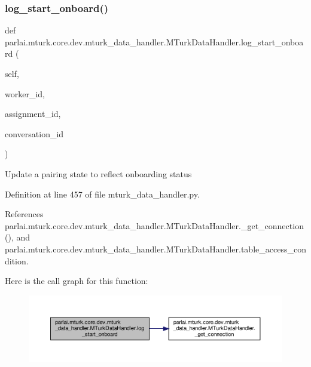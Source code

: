 \subsubsection{\texorpdfstring{log\+\_\+start\+\_\+onboard()}{log\_start\_onboard()}}
{\footnotesize\ttfamily def parlai.\+mturk.\+core.\+dev.\+mturk\+\_\+data\+\_\+handler.\+M\+Turk\+Data\+Handler.\+log\+\_\+start\+\_\+onboard (\begin{DoxyParamCaption}\item[{}]{self,  }\item[{}]{worker\+\_\+id,  }\item[{}]{assignment\+\_\+id,  }\item[{}]{conversation\+\_\+id }\end{DoxyParamCaption})}

\begin{DoxyVerb}Update a pairing state to reflect onboarding status\end{DoxyVerb}
 

Definition at line 457 of file mturk\+\_\+data\+\_\+handler.\+py.



References parlai.\+mturk.\+core.\+dev.\+mturk\+\_\+data\+\_\+handler.\+M\+Turk\+Data\+Handler.\+\_\+get\+\_\+connection(), and parlai.\+mturk.\+core.\+dev.\+mturk\+\_\+data\+\_\+handler.\+M\+Turk\+Data\+Handler.\+table\+\_\+access\+\_\+condition.

Here is the call graph for this function\+:
\nopagebreak
\begin{figure}[H]
\begin{center}
\leavevmode
\includegraphics[width=350pt]{classparlai_1_1mturk_1_1core_1_1dev_1_1mturk__data__handler_1_1MTurkDataHandler_aa084ae52cbcc1fdce7e5a20f079f3f47_cgraph}
\end{center}
\end{figure}
\mbox{\label{classparlai_1_1mturk_1_1core_1_1dev_1_1mturk__data__handler_1_1MTurkDataHandler_ac8a4ba8bd6942424ff47149189c027a3}} 
